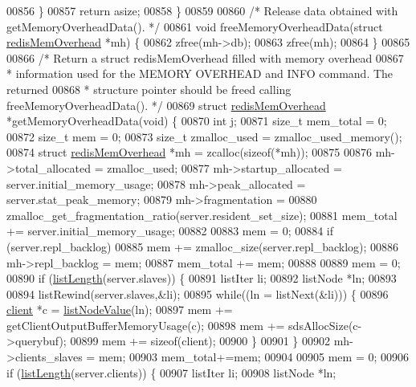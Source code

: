 \begin{DoxyCode}
{00856     \}
00857     \textcolor{keywordflow}{return} asize;
00858 \}
00859 
00860 \textcolor{comment}{/* Release data obtained with getMemoryOverheadData(). */}
00861 \textcolor{keywordtype}{void} freeMemoryOverheadData(\textcolor{keyword}{struct} \hyperlink{structredisMemOverhead}{redisMemOverhead} *mh) \{
00862     zfree(mh->db);
00863     zfree(mh);
00864 \}
00865 
00866 \textcolor{comment}{/* Return a struct redisMemOverhead filled with memory overhead}
00867 \textcolor{comment}{ * information used for the MEMORY OVERHEAD and INFO command. The returned}
00868 \textcolor{comment}{ * structure pointer should be freed calling freeMemoryOverheadData(). */}
00869 \textcolor{keyword}{struct} \hyperlink{structredisMemOverhead}{redisMemOverhead} *getMemoryOverheadData(\textcolor{keywordtype}{void}) \{
00870     \textcolor{keywordtype}{int} j;
00871     size\_t mem\_total = 0;
00872     size\_t mem = 0;
00873     size\_t zmalloc\_used = zmalloc\_used\_memory();
00874     \textcolor{keyword}{struct} \hyperlink{structredisMemOverhead}{redisMemOverhead} *mh = zcalloc(\textcolor{keyword}{sizeof}(*mh));
00875 
00876     mh->total\_allocated = zmalloc\_used;
00877     mh->startup\_allocated = server.initial\_memory\_usage;
00878     mh->peak\_allocated = server.stat\_peak\_memory;
00879     mh->fragmentation =
00880         zmalloc\_get\_fragmentation\_ratio(server.resident\_set\_size);
00881     mem\_total += server.initial\_memory\_usage;
00882 
00883     mem = 0;
00884     \textcolor{keywordflow}{if} (server.repl\_backlog)
00885         mem += zmalloc\_size(server.repl\_backlog);
00886     mh->repl\_backlog = mem;
00887     mem\_total += mem;
00888 
00889     mem = 0;
00890     \textcolor{keywordflow}{if} (\hyperlink{adlist_8h_afde0ab079f934670e82119b43120e94b}{listLength}(server.slaves)) \{
00891         listIter li;
00892         listNode *ln;
00893 
00894         listRewind(server.slaves,&li);
00895         \textcolor{keywordflow}{while}((ln = listNext(&li))) \{
00896             \hyperlink{structclient}{client} *c = \hyperlink{adlist_8h_af84cae230e7180ebcda1e2736fce9f65}{listNodeValue}(ln);
00897             mem += getClientOutputBufferMemoryUsage(c);
00898             mem += sdsAllocSize(c->querybuf);
00899             mem += \textcolor{keyword}{sizeof}(client);
00900         \}
00901     \}
00902     mh->clients\_slaves = mem;
00903     mem\_total+=mem;
00904 
00905     mem = 0;
00906     \textcolor{keywordflow}{if} (\hyperlink{adlist_8h_afde0ab079f934670e82119b43120e94b}{listLength}(server.clients)) \{
00907         listIter li;
00908         listNode *ln;
}
\end{DoxyCode}
